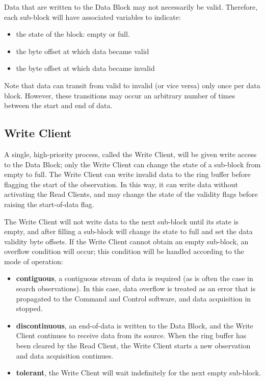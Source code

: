 
Data that are written to the Data Block may not necessarily be valid.
Therefore, each sub-block will have associated variables to indicate:
\begin{itemize}
\item the state of the block: empty or full.
\item the byte offset at which data became valid
\item the byte offset at which data became invalid
\end{itemize}
Note that data can transit from valid to invalid (or vice versa) only
once per data block.  However, these transitions may occur an
arbitrary number of times between the start and end of data.

\subsection{Write Client}

A single, high-priority process, called the Write Client, will be
given write access to the Data Block; only the Write Client can change
the state of a sub-block from empty to full.  The Write Client can
write invalid data to the ring buffer before flagging the start of the
observation.  In this way, it can write data without activating the
Read Clients, and may change the state of the validity flags before
raising the start-of-data flag.

The Write Client will not write data to the next sub-block until its
state is empty, and after filling a sub-block will change its state to
full and set the data validity byte offsets.  If the Write Client
cannot obtain an empty sub-block, an overflow condition will occur;
this condition will be handled according to the mode of operation:

\begin{itemize}

\item {\bf contiguous}, a contiguous stream of data is required (as is
  often the case in search observations).  In this case, data overflow
  is treated as an error that is propagated to the Command and Control
  software, and data acquisition in stopped.

\item {\bf discontinuous}, an end-of-data is written to the Data
  Block, and the Write Client continues to receive data from its
  source.  When the ring buffer has been cleared by the Read Client,
  the Write Client starts a new observation and data acquisition
  continues.

\item {\bf tolerant}, the Write Client will wait indefinitely for
  the next empty sub-block.

\end{itemize}

